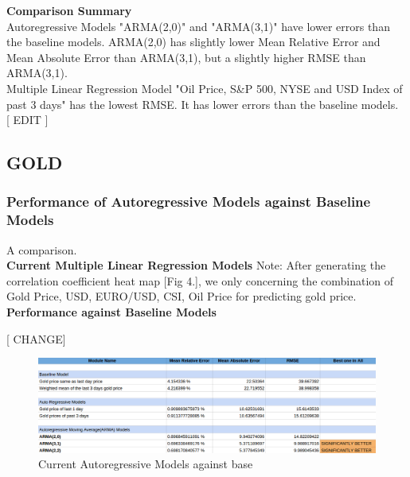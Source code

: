 \documentclass[runningheads]{llncs}
\begin{document}
\noindent\textbf{Comparison Summary} \\
Autoregressive Models "ARMA(2,0)" and "ARMA(3,1)" have lower errors than the baseline models. ARMA(2,0) has slightly lower Mean Relative Error and Mean Absolute Error than ARMA(3,1), but a slightly higher RMSE than ARMA(3,1). \\
Multiple Linear Regression Model "Oil Price, S\&P 500, NYSE and USD Index of past 3 days" has the lowest RMSE. 
It has lower errors than the baseline models. \\

[ EDIT ]


\subsection {GOLD}

\subsubsection {Performance of Autoregressive Models against Baseline Models} A comparison.\\

\noindent\textbf{Current Multiple Linear Regression Models}
Note: After generating the correlation coefficient heat map [Fig 4.], we only concerning the combination of Gold Price, USD, EURO/USD, CSI, Oil Price for predicting gold price. \\

\noindent\textbf{Performance against Baseline Models}

[ CHANGE]

\begin{figure}
\centering
\includegraphics[width=\textwidth]{GoldAutoAgainstBase_Daily.png}
\caption{Current Autoregressive Models against base}
\label{fig:GoldAutoAgainstBase_Daily.png}
\end{figure}
\end{document}

